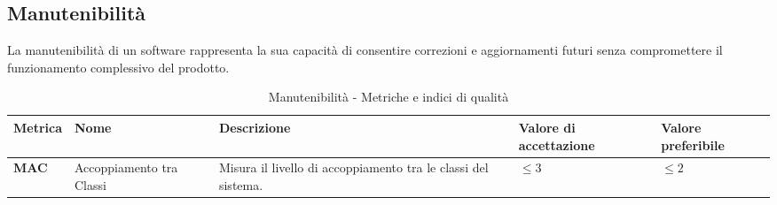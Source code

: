 \subsection{Manutenibilità}
La manutenibilità di un software rappresenta la sua capacità di consentire correzioni e aggiornamenti futuri senza compromettere il funzionamento complessivo del prodotto. 
\begin{table}[H]
    \centering
    \begin{tabular}{|C{1.5cm}|L{3cm}|L{4cm}|L{2.5cm}|L{2.5cm}|}
        \hline
        \textbf{Metrica} & \textbf{Nome} & \textbf{Descrizione} & \textbf{Valore di accettazione} & \textbf{Valore preferibile} \\
        \hline
        \textbf{MAC} & Accoppiamento tra Classi & Misura il livello di accoppiamento tra le classi del sistema. & $\leq 3$ & $\leq 2$ \\
        \hline
    \end{tabular}
    \caption{Manutenibilità - Metriche e indici di qualità}
    \label{tab:manutenibilità_qualita_prodotto}
\end{table}